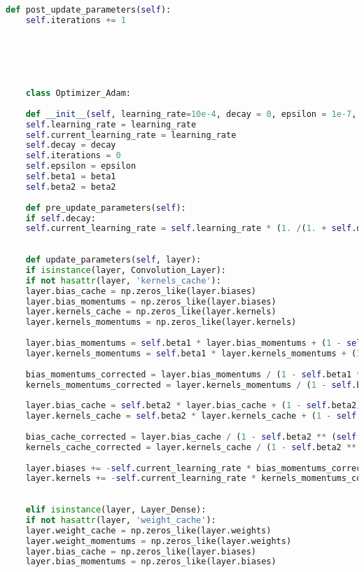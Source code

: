 \begin{lstlisting}[language=Python, caption=Optimizer function]
	def post_update_parameters(self):
	self.iterations += 1
	
	
	
	
	
	
	class Optimizer_Adam:
	
	def __init__(self, learning_rate=10e-4, decay = 0, epsilon = 1e-7, beta1=0.9, beta2=0.999):
	self.learning_rate = learning_rate
	self.current_learning_rate = learning_rate
	self.decay = decay
	self.iterations = 0
	self.epsilon = epsilon
	self.beta1 = beta1
	self.beta2 = beta2
	
	def pre_update_parameters(self):
	if self.decay:
	self.current_learning_rate = self.learning_rate * (1. /(1. + self.decay * self.iterations))
	
	
	def update_parameters(self, layer):
	if isinstance(layer, Convolution_Layer):
	if not hasattr(layer, 'kernels_cache'):
	layer.bias_cache = np.zeros_like(layer.biases)
	layer.bias_momentums = np.zeros_like(layer.biases)
	layer.kernels_cache = np.zeros_like(layer.kernels)
	layer.kernels_momentums = np.zeros_like(layer.kernels)
	
	layer.bias_momentums = self.beta1 * layer.bias_momentums + (1 - self.beta1) * layer.d_biases
	layer.kernels_momentums = self.beta1 * layer.kernels_momentums + (1 - self.beta1) * layer.d_kernels
	
	bias_momentums_corrected = layer.bias_momentums / (1 - self.beta1 ** (self.iterations +1))
	kernels_momentums_corrected = layer.kernels_momentums / (1 - self.beta1 ** (self.iterations +1))
	
	layer.bias_cache = self.beta2 * layer.bias_cache + (1 - self.beta2) * layer.d_biases**2
	layer.kernels_cache = self.beta2 * layer.kernels_cache + (1 - self.beta2) * layer.d_kernels**2
	
	bias_cache_corrected = layer.bias_cache / (1 - self.beta2 ** (self.iterations+1))
	kernels_cache_corrected = layer.kernels_cache / (1 - self.beta2 ** (self.iterations+1))
	
	layer.biases += -self.current_learning_rate * bias_momentums_corrected / (np.sqrt(bias_cache_corrected) + self.epsilon)
	layer.kernels += -self.current_learning_rate * kernels_momentums_corrected / (np.sqrt(kernels_cache_corrected) + self.epsilon)
	
	
	elif isinstance(layer, Layer_Dense):
	if not hasattr(layer, 'weight_cache'):
	layer.weight_cache = np.zeros_like(layer.weights)
	layer.weight_momentums = np.zeros_like(layer.weights)
	layer.bias_cache = np.zeros_like(layer.biases)
	layer.bias_momentums = np.zeros_like(layer.biases)
	

\end{lstlisting}
